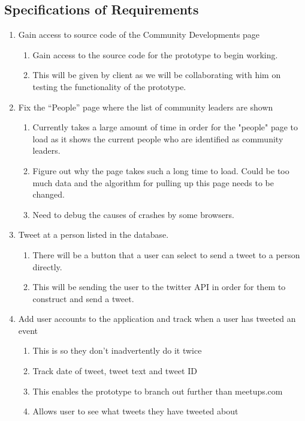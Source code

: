 \documentclass[draftclsnofoot,10pt,onecolumn]{IEEEtran} %
\begin{document}
\subsection{Specifications of Requirements}
\begin{enumerate}
\item Gain access to source code of the Community Developments page \\

\begin{enumerate}
\item Gain access to the source code for the prototype to begin working.
\item This will be given by client as we will be collaborating with him on testing the functionality of the prototype.\\
\end{enumerate}

\item Fix the “People” page where the list of community leaders are shown \\
\begin{enumerate}
\item Currently takes a large amount of time in order for the "people" page to load as it shows the current people who are 
identified as community leaders.
\item Figure out why the page takes such a long time to load. Could be too much data and the algorithm for pulling up this 
page needs to be changed. 
\item Need to debug the causes of crashes by some browsers. \\
\end{enumerate}

\item Tweet at a person listed in the database. \\
\begin{enumerate}
\item There will be a button that a user can select to send a tweet to a person directly.
\item This will be sending the user to the twitter API in order for them to construct and send a tweet. \\
\end{enumerate}

\item Add user accounts to the application and track when a user has tweeted an event \\
\begin{enumerate}
\item This is so they don't inadvertently do it twice
\item Track date of tweet, tweet text and tweet ID
\item This enables the prototype to branch out further than meetups.com
\item Allows user to see what tweets they have tweeted about \\
\end{enumerate}


\end{enumerate}
\end{document}
